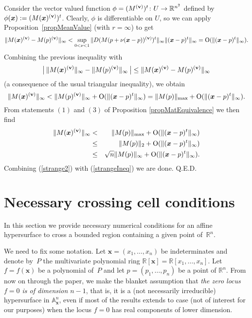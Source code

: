 \documentclass[10pt]{article}
\newcommand\qed{{\hspace*{\fill}Q.E.D.\vskip12pt plus 1pt}}
\newcommand{\x}{{\bm x}}
\newcommand\R{{\mathbb R}}
\begin{document}
 Consider the vector valued function
$\phi=(M^{(\bf v)})^t\colon  U \rightarrow \R^{n^2}$ defined by $\phi(\x):= (M(\x)^{(\bf v)})^t$.
Clearly, $\phi$ is differentiable on $U$, so we can 
  apply Proposition~\ref{propMeanValue} (with $r =\infty$)  to get
$$
\|M(\x)^{(\bf v)}- M(p)^{(\bf v)}\|_\infty < 
\sup_{0<\nu<1} \|D (M(p+\nu(\x-p))^{(\bf v)})^t \|_\infty \|(\x-p)^t\|_\infty   
 ={\rm O}(\|(\x-p)^t\|_\infty).
$$
Combining the previous inequality with 
$$
\big|\: \|M(\x)^{(\bf v)}\|_\infty- \|M(p)^{(\bf v)}\|_\infty \: \big| \le \|M(\x)^{(\bf v)}- M(p)^{(\bf v)}\|_\infty
$$ (a consequence of the usual triangular inequality),
we obtain 
$$\|M(\x)^{(\bf v)}\|_\infty < \|M(p)^{(\bf v)}\|_\infty + {\rm O}(\|(\x-p)^t\|_\infty)=\|M(p)\|_{\rm max} + {\rm O}(\|(\x-p)^t\|_\infty).$$
From statements $(1)$ and $(3)$ of Proposition \ref{propMatEquivalence}   we then find 
\begin{eqnarray}\label{strange2}
\|M(\x)^{(\bf v)}\|_\infty &<& \|M(p)\|_{\rm max} + {\rm O}(\|(\x-p)^t\|_\infty) \nonumber \\
&\le& \|M(p)\|_2 + {\rm O}(\|(\x-p)^t\|_\infty) \nonumber \\
&\le& \sqrt{n}\|M(p)\|_\infty + {\rm O}(\|(\x-p)^t\|_\infty).
\end{eqnarray}
Combining (\ref{strange2}) with (\ref{strangeIneq}) we are done.
\qed 




\section{Necessary crossing cell conditions }\label{passaggioCella1}
\addtocounter{subsection}{1}\setcounter{theorem}{0}
In this section we  provide necessary   numerical conditions for 
an affine hypersurface  to cross a bounded region containing 
 a given point of~$\R^n$. 
 
 
 We need to fix some notation. Let $\x=(x_1,\ldots,x_n)$ be indeterminates and denote by~$P$
the multivariate polynomial ring $\R[\x]=\R[x_1,\ldots,x_n]$.
Let $f=f(\x)$ be a polynomial of~$P$ and let $p=(p_1,\ldots,p_n)$ be a point of $\R^n$. 
From now on through the paper, we make the blanket assumption that {\em the zero locus $f=0$ is of dimension $n-1$}, that is, it is a (not necessarily
irreducible) hypersurface in ${\mathbb A}_{\x}^n$, even if most of the results extends to case (not of interest  for our purposes) when the locus $f=0$
 has real components of lower dimension.
\end{document}
